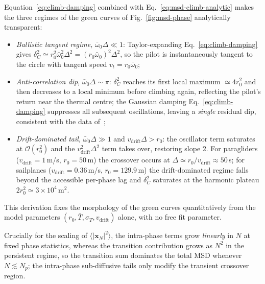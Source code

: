 \documentclass[11pt,a4paper]{article}
\begin{document}
Equation~\eqref{eq:climb-damping} combined with
Eq.~\eqref{eq:msd-climb-analytic} makes the three regimes of the
green curves of Fig.~\ref{fig:msd-phase} analytically transparent:
\begin{itemize}
\setlength{\itemsep}{0.6ex}
\item \emph{Ballistic tangent regime,}
$\bar{\omega}_0\Delta\ll 1$: Taylor-expanding
Eq.~\eqref{eq:climb-damping} gives
$\delta^2_C \simeq r_0^2\bar{\omega}_0^2\Delta^2 =
(r_0\bar{\omega}_0)^2\Delta^2$, so the pilot is instantaneously
tangent to the circle with tangent speed
$v_t = r_0\bar{\omega}_0$;
\item \emph{Anti-correlation dip,}
$\bar{\omega}_0\Delta\sim\pi$: $\delta^2_C$ reaches its first local
maximum $\simeq 4 r_0^2$ and then decreases to a local minimum
before climbing again, reflecting the pilot's return near the
thermal centre; the Gaussian damping
Eq.~\eqref{eq:climb-damping} suppresses all subsequent
oscillations, leaving a \emph{single} residual dip, consistent
with the data of~\cite{vilpellet2026};
\item \emph{Drift-dominated tail,} $\bar{\omega}_0\Delta\gg 1$ and
$v_{\mathrm{drift}}\Delta > r_0$: the oscillator term saturates
at $\mathcal{O}(r_0^2)$ and the $v_{\mathrm{drift}}^2\Delta^2$
term takes over, restoring slope 2. For paragliders
($v_{\mathrm{drift}}=1$\,m/s, $r_0=50$\,m) the crossover occurs at
$\Delta \simeq r_0/v_{\mathrm{drift}}\approx 50$\,s; for
sailplanes ($v_{\mathrm{drift}}=0.36$\,m/s,
$r_0=129.9$\,m) the drift-dominated regime falls beyond the
accessible per-phase lag and $\delta^2_C$ saturates at the
harmonic plateau $2 r_0^2\simeq 3\times 10^4$\,m$^2$.
\end{itemize}
This derivation fixes the morphology of the green curves
quantitatively from the model parameters
$(r_0, \bar{T}, \sigma_T, v_{\mathrm{drift}})$ alone, with no free
fit parameter.

Crucially for the scaling of $\langle|\mathbf{x}_N|^2\rangle$, the
intra-phase terms grow \emph{linearly} in $N$ at fixed phase
statistics, whereas the transition contribution grows as $N^2$ in
the persistent regime, so the transition sum dominates the total
MSD whenever $N \lesssim N_p$; the intra-phase sub-diffusive tails
only modify the transient crossover region.
\end{document}
